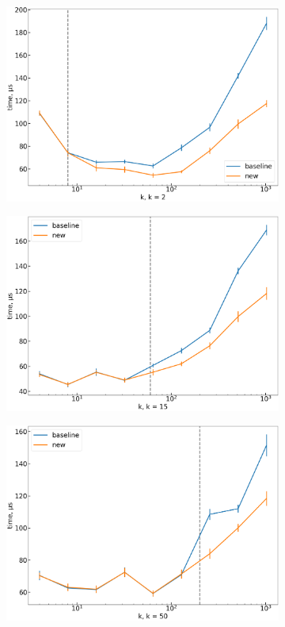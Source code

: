 \documentclass[final,5p,twocolumn,times,authoryear]{elsarticle}
\begin{document}
\begin{figure}[h]
	\centering
	\begin{subfigure}[t]{0.35\textwidth}
		\centering
		\includegraphics[width=\linewidth]{boost_k_fixed_2.png}
		\caption{}
	\end{subfigure}
	\;
	\begin{subfigure}[t]{0.35\textwidth}
		\centering
		\includegraphics[width=\linewidth]{boost_k_fixed_15.png}
		\caption{}
	\end{subfigure}
	\;
	\begin{subfigure}[t]{0.35\textwidth}
		\centering
		\includegraphics[width=\linewidth]{boost_k_fixed_50.png}

\end{subfigure}
\end{figure}
\end{document}
